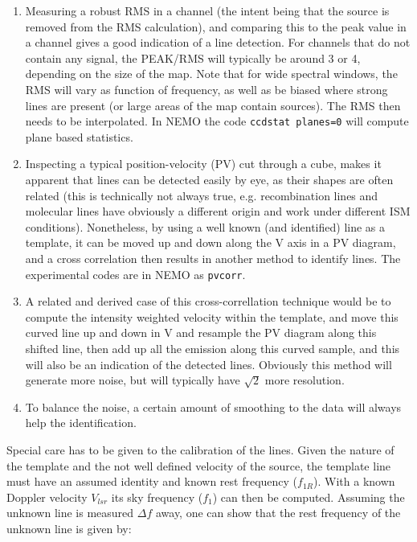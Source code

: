 \documentclass[preprint]{aastex} %
\begin{document}
\begin{enumerate}

\item
Measuring a robust RMS in a channel (the intent being that the source is removed from the 
RMS calculation), and comparing this to the peak value in a channel gives a good 
indication of a line detection. For channels that do not contain any signal, 
the PEAK/RMS will typically be around 3 or 4, depending on the size of the map.
Note that for wide spectral windows, the RMS will vary as function of frequency,
as well as be biased where strong lines are present (or large areas of the map
contain sources). The RMS then needs to be interpolated. In NEMO the code
{\tt ccdstat planes=0} will compute plane based statistics.

\item
Inspecting a typical position-velocity (PV) cut through a cube, makes it apparent
that lines can be detected easily by eye, as their shapes are often related
(this is technically not always true, e.g. recombination lines and molecular lines have
obviously a different origin and work under different ISM conditions). Nonetheless,
by using a well known (and identified) line as a template, it can be moved up and down
along the V axis in a PV diagram, and a cross correlation then results in another method
to identify lines. The experimental codes are in NEMO as {\tt pvcorr}.


\item
A related and derived case of this
cross-correllation technique would be to compute the intensity
weighted velocity within the template, and move this curved line up and down in V and resample
the PV diagram along this shifted line, then add up all the emission along this curved
sample, and this will also be an indication of the detected lines.  Obviously this
method will generate more noise, but will typically have $\sqrt{2}$ more resolution.

\item
To balance the noise, a certain amount of smoothing to the data will always help
the identification.


\end{enumerate}

Special care has to be given to the calibration of the lines. Given the nature of
the template and the not well defined velocity of the source, the template line
must have an assumed identity and known rest frequency  ($f_{1R}$). 
With a known Doppler velocity $V_{lsr}$ its sky frequency ($f_1$) 
can then be computed.  Assuming the unknown line is measured ${\Delta f}$ away, one
can show that the rest frequency of the unknown line is given by:
\end{document}
